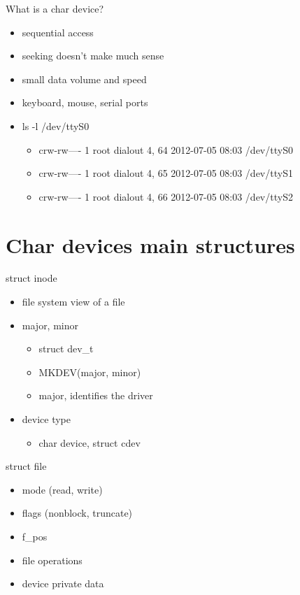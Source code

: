 \documentclass{workshop}
\begin{document}
\begin{frame}{What is a char device?}
      \begin{itemize}
        \item sequential access
	\item seeking doesn't make much sense
	\item small data volume and speed
	\item keyboard, mouse, serial ports
	\item  ls -l /dev/ttyS0
	\begin{itemize} 
	\item crw-rw---- 1 root dialout 4, 64 2012-07-05 08:03 /dev/ttyS0
	\item crw-rw---- 1 root dialout 4, 65 2012-07-05 08:03 /dev/ttyS1
	\item crw-rw---- 1 root dialout 4, 66 2012-07-05 08:03 /dev/ttyS2
	\end{itemize}
      \end{itemize}
\end{frame}

\section{Char devices main structures}
\begin{frame}{struct inode}
      \begin{itemize}
        \item file system view of a file
	\item major, minor
	\begin{itemize}
		\item struct dev_t  
		\item MKDEV(major, minor)
		\item major, identifies the driver
	\end{itemize}
	\item device type
		\begin{itemize}
		\item char device, struct cdev
		\end{itemize}
      \end{itemize}
\end{frame}

\begin{frame}{struct file}
      \begin{itemize}
        \item mode (read, write)
	\item flags (nonblock, truncate)
	\item f_pos
	\item file operations
	\item device private data
      \end{itemize}
\end{frame}
\end{document}
